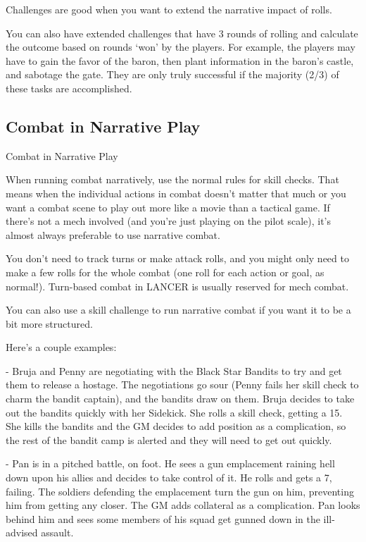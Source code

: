 Challenges are good when you want to extend the narrative impact of rolls.   

You can also have extended challenges that have 3 rounds of rolling and calculate the outcome  
based on rounds ‘won’ by the players. For example, the players may have to gain the favor of the  
baron, then plant information in the baron’s castle, and sabotage the gate. They are only truly  
successful if the majority (2/3) of these tasks are accomplished.  

\subsection{Combat in Narrative Play}
                                      Combat in Narrative Play
 

When running combat narratively, use the normal rules for skill checks. That means when the  
individual actions in combat doesn’t matter that much or you want a combat scene to play out  
more like a movie than a tactical game. If there’s not a mech involved (and you’re just playing on  
the pilot scale), it’s almost always preferable to use narrative combat.
 

                                                                                                                   


You don’t need to track turns or make attack rolls, and you might only need to make a few rolls  
for the whole combat (one roll for each action or goal, as normal!). Turn-based combat in  
LANCER is usually reserved for mech combat.
 

You can also use a skill challenge to run narrative combat if you want it to be a bit more  
structured.
 

Here’s a couple examples:
 
	        - Bruja and Penny are negotiating with the Black Star Bandits to try and get them to  
release a hostage. The negotiations go sour (Penny fails her skill check to charm the bandit  
captain), and the bandits draw on them. Bruja decides to take out the bandits quickly with her  
Sidekick. She rolls a skill check, getting a 15. She kills the bandits and the GM decides to add  
position as a complication, so the rest of the bandit camp is alerted and they will need to get out  
quickly.
 
	        - Pan is in a pitched battle, on foot. He sees a gun emplacement raining hell down upon  
his allies and decides to take control of it. He rolls and gets a 7, failing. The soldiers defending  
the emplacement turn the gun on him, preventing him from getting any closer. The GM adds  
collateral as a complication. Pan looks behind him and sees some members of his squad get  
gunned down in the ill-advised assault.
 
